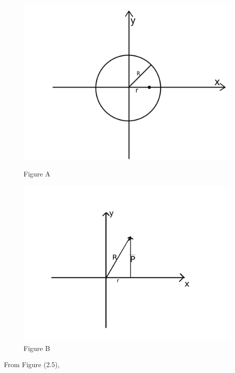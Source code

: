 \begin{figure}[!tbp] 
\centering
\begin{minipage}[b]{0.3\textwidth}
\includegraphics[width=\textwidth]{fig2}
\caption{Figure A}
\end{minipage}
\hfill
\begin{minipage}[b]{0.3\textwidth}
\includegraphics[width=\textwidth]{fig1}
\caption{Figure B}
\end{minipage}
\end{figure}

From Figure (2.5), 

